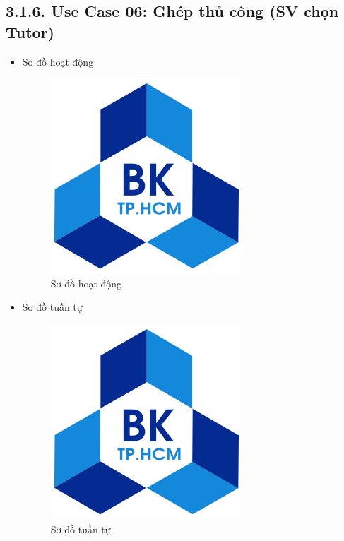 \subsection*{3.1.6. Use Case 06: Ghép thủ công (SV chọn Tutor)}
\begin{itemize}
    \item Sơ đồ hoạt động
    \begin{figure}[H]
    \centering
    \includegraphics[scale=0.5 ]{Picture/hcmut.png}
    \caption{Sơ đồ hoạt động }
    \end{figure}
    \item Sơ đồ tuần tự
    \begin{figure}[H]
    \centering
    \includegraphics[scale=0.5 ]{Picture/hcmut.png}
    \caption{Sơ đồ tuần tự }
    \end{figure}
\end{itemize}

